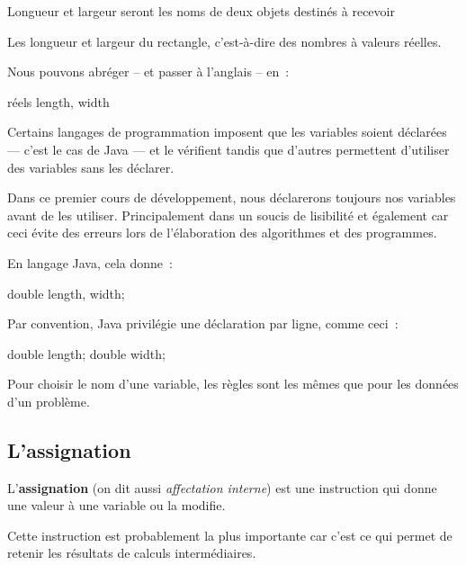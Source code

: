 			\begin{langagenaturel}
				Longueur et largeur seront les noms de deux 
				objets destinés à recevoir
				
				Les longueur et largeur du rectangle, 
				c’est-à-dire des nombres à valeurs réelles.
				
			\end{langagenaturel}
	
			Nous pouvons abréger -- et passer à l'anglais -- en~:

			\begin{langagenaturel}
				réels length, width
			\end{langagenaturel}
	
			Certains langages de programmation imposent que les variables soient 
			déclarées — c'est le cas de Java — et le vérifient tandis que d'autres 
			permettent d'utiliser des variables sans les déclarer. 
			
			Dans ce premier cours de développement, nous déclarerons toujours nos
			variables avant de les utiliser. Principalement dans un soucis de
			lisibilité et également car ceci évite des erreurs lors de
			l'élaboration des algorithmes et des programmes.  

			En langage Java, cela donne~:

			\begin{java}
double length, width;
			\end{java}

			Par convention, Java privilégie une déclaration par ligne, comme 
			ceci~:
			
			\begin{java}
double length;
double width;
			\end{java}
			
			Pour choisir le nom d’une variable, les règles sont les mêmes que
			pour les données d’un problème.


			\pagebreak
		\subsection{L’assignation}
	
			L’\textbf{assignation}
			(on dit aussi \emph{affectation interne})
			est une instruction qui donne une valeur 
			à une variable ou la modifie.
	
			Cette instruction est probablement la plus importante
			car c’est ce qui permet de retenir les résultats 
			de calculs intermédiaires.

